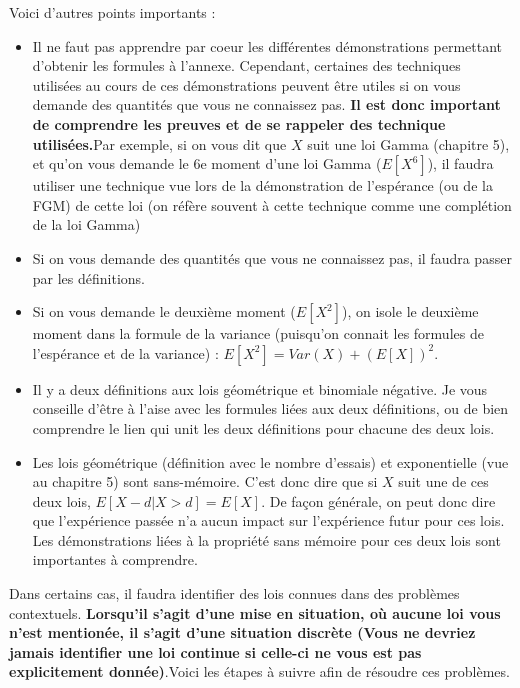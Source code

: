 \documentclass[10pt, french]{article}
\begin{document}
\begin{multicols*}{2}
\begin{definitionNOHFILL}
Voici d'autres points importants :

\begin{itemize}
	\item Il ne faut pas apprendre par coeur les différentes démonstrations permettant d'obtenir les formules à l'annexe. Cependant, certaines des techniques utilisées au cours de ces démonstrations peuvent être utiles si on vous demande des quantités que vous ne connaissez pas. \textbf{Il est donc important de comprendre les preuves et de se rappeler des technique utilisées.}Par exemple, si on vous dit que $X$ suit une loi Gamma (chapitre 5), et qu'on vous demande le 6e moment d'une loi Gamma ($E[X^6]$), il faudra utiliser une technique vue lors de la démonstration de l'espérance (ou de la FGM) de cette loi (on réfère souvent à cette technique comme une complétion de la loi Gamma)
	\item Si on vous demande des quantités que vous ne connaissez pas, il faudra passer par les définitions.
	\item Si on vous demande le deuxième moment ($E[X^2]$), on isole le deuxième moment dans la formule de la variance (puisqu'on connait les formules de l'espérance et de la variance) : $E[X^2] = Var(X) + (E[X])^2$.
	\item Il y a deux définitions aux lois géométrique et binomiale négative. Je vous conseille d'être à l'aise avec les formules liées aux deux définitions, ou de bien comprendre le lien qui unit les deux définitions pour chacune des deux lois.
	\item Les lois géométrique (définition avec le nombre d'essais) et exponentielle (vue au chapitre 5) sont sans-mémoire. C'est donc dire que si $X$ suit une de ces deux lois, $E[X - d|X > d] = E[X]$. De façon générale, on peut donc dire que l'expérience passée n'a aucun impact sur l'expérience futur pour ces lois. Les démonstrations liées à la propriété sans mémoire pour ces deux lois sont importantes à comprendre.
\end{itemize}

\end{definitionNOHFILL}

\begin{definitionNOHFILL}
Dans certains cas, il faudra identifier des lois connues dans des problèmes contextuels.\textbf{ Lorsqu'il s'agit d'une mise en situation, où aucune loi vous n'est mentionée, il s'agit d'une situation discrète (Vous ne devriez jamais identifier une loi continue si celle-ci ne vous est pas explicitement donnée)}.Voici les étapes à suivre afin de résoudre ces problèmes.\\


\end{definitionNOHFILL}
\end{multicols*}
\end{document}
